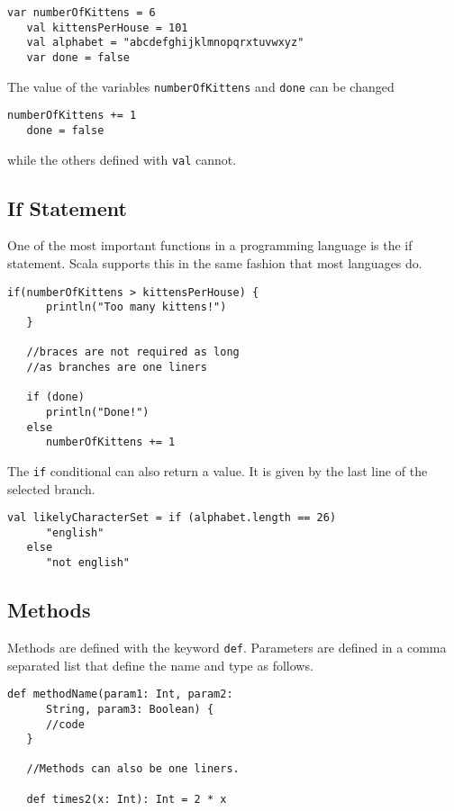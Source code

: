 \documentclass[12pt, letterpaper]{report}
\begin{document}
\begin{lstlisting}[style=scala]
   var numberOfKittens = 6
   val kittensPerHouse = 101
   val alphabet = "abcdefghijklmnopqrxtuvwxyz"
   var done = false
\end{lstlisting}

\noindent The value of the variables \verb|numberOfKittens| and \verb|done| can be changed

\begin{lstlisting}[style=scala]
   numberOfKittens += 1
   done = false
\end{lstlisting}

\noindent while the others defined with \verb|val| cannot.

\subsection{If Statement}
One of the most important functions in a programming language is the if statement. Scala supports this in the same fashion that most languages do.

\begin{lstlisting}[style=scala]
   if(numberOfKittens > kittensPerHouse) {
      println("Too many kittens!")
   }

   //braces are not required as long 
   //as branches are one liners

   if (done) 
      println("Done!")
   else
      numberOfKittens += 1

\end{lstlisting}

\noindent The \verb|if| conditional can also return a value. It is given by the last line of the selected branch.

\begin{lstlisting}[style=scala]
   val likelyCharacterSet = if (alphabet.length == 26) 
      "english"
   else
      "not english"
\end{lstlisting}

\subsection{Methods}
Methods are defined with the keyword \verb|def|.
Parameters are defined in a comma separated list that define the name and type as follows.

\begin{lstlisting}[style=scala]
   def methodName(param1: Int, param2: 
      String, param3: Boolean) {
      //code
   }

   //Methods can also be one liners.

   def times2(x: Int): Int = 2 * x 
\end{lstlisting}
\end{document}
